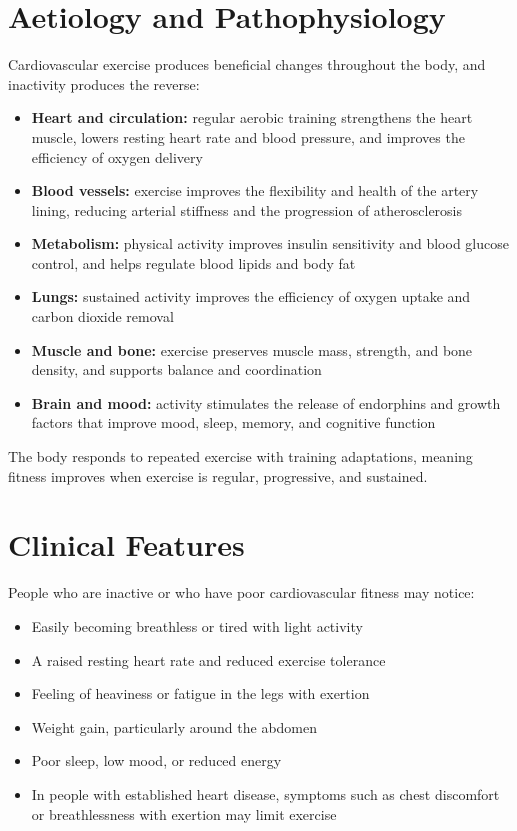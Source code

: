 \section*{Aetiology and Pathophysiology}
Cardiovascular exercise produces beneficial changes throughout the body, and inactivity produces the reverse:
\begin{itemize}
    \item \textbf{Heart and circulation:} regular aerobic training strengthens the heart muscle, lowers resting heart rate and blood pressure, and improves the efficiency of oxygen delivery
    \item \textbf{Blood vessels:} exercise improves the flexibility and health of the artery lining, reducing arterial stiffness and the progression of atherosclerosis
    \item \textbf{Metabolism:} physical activity improves insulin sensitivity and blood glucose control, and helps regulate blood lipids and body fat
    \item \textbf{Lungs:} sustained activity improves the efficiency of oxygen uptake and carbon dioxide removal
    \item \textbf{Muscle and bone:} exercise preserves muscle mass, strength, and bone density, and supports balance and coordination
    \item \textbf{Brain and mood:} activity stimulates the release of endorphins and growth factors that improve mood, sleep, memory, and cognitive function
\end{itemize}
The body responds to repeated exercise with training adaptations, meaning fitness improves when exercise is regular, progressive, and sustained.

\section*{Clinical Features}
People who are inactive or who have poor cardiovascular fitness may notice:
\begin{itemize}
    \item Easily becoming breathless or tired with light activity
    \item A raised resting heart rate and reduced exercise tolerance
    \item Feeling of heaviness or fatigue in the legs with exertion
    \item Weight gain, particularly around the abdomen
    \item Poor sleep, low mood, or reduced energy
    \item In people with established heart disease, symptoms such as chest discomfort or breathlessness with exertion may limit exercise
\end{itemize}

